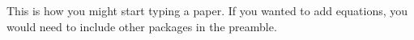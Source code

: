 \documentclass{article}
\begin{document}
This is how you might start typing a paper. If you wanted to add equations, you would need to include other packages in the preamble.
\end{document}
